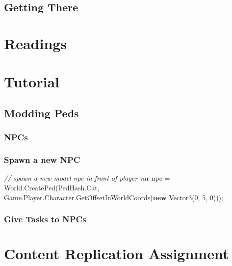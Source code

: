 \documentclass[
  openany]{book}
\newenvironment{Shaded}{\begin{snugshade}}{\end{snugshade}}
\newcommand{\CommentTok}[1]{\textcolor[rgb]{0.56,0.35,0.01}{\textit{#1}}}
\newcommand{\DataTypeTok}[1]{\textcolor[rgb]{0.13,0.29,0.53}{#1}}
\newcommand{\DecValTok}[1]{\textcolor[rgb]{0.00,0.00,0.81}{#1}}
\newcommand{\FunctionTok}[1]{\textcolor[rgb]{0.00,0.00,0.00}{#1}}
\newcommand{\KeywordTok}[1]{\textcolor[rgb]{0.13,0.29,0.53}{\textbf{#1}}}
\newcommand{\NormalTok}[1]{#1}
\begin{document}
\hypertarget{getting-there-6}{%
\subsection{Getting There}\label{getting-there-6}}

\hypertarget{readings-4}{%
\section{Readings}\label{readings-4}}

\hypertarget{tutorial-4}{%
\section{Tutorial}\label{tutorial-4}}

\hypertarget{modding-peds}{%
\subsection{Modding Peds}\label{modding-peds}}

\hypertarget{npcs}{%
\subsubsection{NPCs}\label{npcs}}

\hypertarget{spawn-a-new-npc}{%
\subsubsection{Spawn a new NPC}\label{spawn-a-new-npc}}

\begin{Shaded}
\begin{Highlighting}[]
\CommentTok{// spawn a new model npc in front of player}
\DataTypeTok{var}\NormalTok{ npc = World.}\FunctionTok{CreatePed}\NormalTok{(PedHash.}\FunctionTok{Cat}\NormalTok{, Game.}\FunctionTok{Player}\NormalTok{.}\FunctionTok{Character}\NormalTok{.}\FunctionTok{GetOffsetInWorldCoords}\NormalTok{(}\KeywordTok{new} \FunctionTok{Vector3}\NormalTok{(}\DecValTok{0}\NormalTok{, }\DecValTok{5}\NormalTok{, }\DecValTok{0}\NormalTok{))); }
\end{Highlighting}
\end{Shaded}

\hypertarget{give-tasks-to-npcs}{%
\subsubsection{Give Tasks to NPCs}\label{give-tasks-to-npcs}}

\hypertarget{content-replication-assignment-3}{%
\section{Content Replication Assignment}\label{content-replication-assignment-3}}
\end{document}
